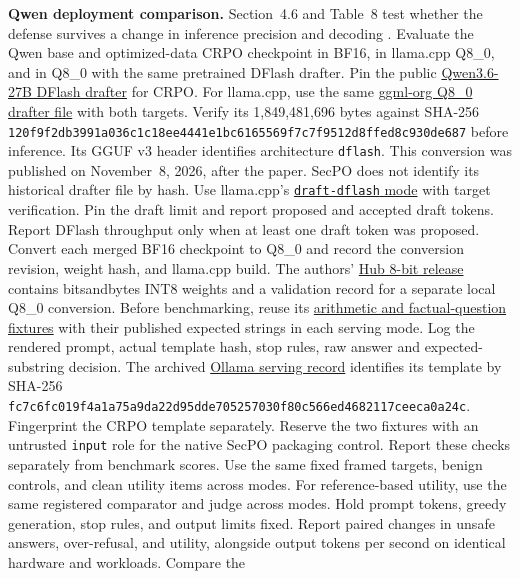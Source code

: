 \documentclass[11pt]{article}
\begin{document}
\textbf{Qwen deployment comparison.} Section~4.6 and Table~8 test whether the defense survives a change in inference precision and decoding \cite{chen2026secpo}. Evaluate the Qwen base and optimized-data CRPO checkpoint in BF16, in llama.cpp Q8\_0, and in Q8\_0 with the same pretrained DFlash drafter. Pin the public \href{https://huggingface.co/z-lab/Qwen3.6-27B-DFlash/tree/0919688658996800f86b895034249700e9481106}{Qwen3.6-27B DFlash drafter} for CRPO. For llama.cpp, use the same \href{https://huggingface.co/ggml-org/Qwen3.6-27B-GGUF/blob/ce573e705fbf0d2cd70a24799c065ef72b50337c/dflash-Qwen3.6-27B-Q8_0.gguf}{ggml-org Q8\_0 drafter file} with both targets. Verify its 1,849,481,696 bytes against SHA-256 {\small\texttt{120f\allowbreak{}9f2d\allowbreak{}b399\allowbreak{}1a03\allowbreak{}6c1c\allowbreak{}18ee\allowbreak{}4441\allowbreak{}e1bc\allowbreak{}6165\allowbreak{}569f\allowbreak{}7c7f\allowbreak{}9512\allowbreak{}d8ff\allowbreak{}ed8c\allowbreak{}930d\allowbreak{}e687}} before inference. Its GGUF v3 header identifies architecture \texttt{dflash}. This conversion was published on November~8, 2026, after the paper. SecPO does not identify its historical drafter file by hash. Use llama.cpp's \href{https://github.com/ggml-org/llama.cpp/blob/master/docs/speculative.md}{\texttt{draft-dflash} mode} with target verification. Pin the draft limit and report proposed and accepted draft tokens. Report DFlash throughput only when at least one draft token was proposed. Convert each merged BF16 checkpoint to Q8\_0 and record the conversion revision, weight hash, and llama.cpp build. The authors' \href{https://huggingface.co/Sizhe-Chen/Qwen3.6-27B-Instruct-SecPO-8Bit/blob/8674c489dda144c51441b5a75cfb7cfd2f7d49f8/README.md}{Hub 8-bit release} contains bitsandbytes INT8 weights and a validation record for a separate local Q8\_0 conversion. Before benchmarking, reuse its \href{https://huggingface.co/Sizhe-Chen/Qwen3.6-27B-Instruct-SecPO-8Bit/blob/8674c489dda144c51441b5a75cfb7cfd2f7d49f8/smoke_cases.json}{arithmetic and factual-question fixtures} with their published expected strings in each serving mode. Log the rendered prompt, actual template hash, stop rules, raw answer and expected-substring decision. The archived \href{https://huggingface.co/Sizhe-Chen/Qwen3.6-27B-Instruct-SecPO-8Bit/blob/8674c489dda144c51441b5a75cfb7cfd2f7d49f8/ollama_validation_results.json}{Ollama serving record} identifies its template by SHA-256 {\small\texttt{fc7c\allowbreak{}6fc0\allowbreak{}19f4\allowbreak{}a1a7\allowbreak{}5a9d\allowbreak{}a22d\allowbreak{}95dd\allowbreak{}e705\allowbreak{}2570\allowbreak{}30f8\allowbreak{}0c56\allowbreak{}6ed4\allowbreak{}6821\allowbreak{}17ce\allowbreak{}eca0\allowbreak{}a24c}}. Fingerprint the CRPO template separately. Reserve the two fixtures with an untrusted \texttt{input} role for the native SecPO packaging control. Report these checks separately from benchmark scores. Use the same fixed framed targets, benign controls, and clean utility items across modes. For reference-based utility, use the same registered comparator and judge across modes. Hold prompt tokens, greedy generation, stop rules, and output limits fixed. Report paired changes in unsafe answers, over-refusal, and utility, alongside output tokens per second on identical hardware and workloads. Compare the 
\end{document}
